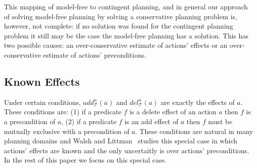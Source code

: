 \documentclass[letterpaper]{article}
\begin{document}
This mapping of model-free to contingent planning, and in general our approach of solving model-free planning by solving a conservative planning problem is, however, not complete: if no solution was found for the contingent planning problem it still may be the case the model-free planning has a solution. This has two possible causes: an over-conservative estimate of actions' effects or an over-conservative estimate of actions' preconditions. 

\subsection{Known Effects}

 
 Under certain conditions, $add_\mathcal{T}^u(a)$ 
 and $del_\mathcal{T}^u(a)$ are exactly the effects of $a$. These conditions are:
 (1) if a predicate $f$ is a delete effect of an action $a$ then $f$ is a precondition of $a$, 
 (2) if a predicate $f$ is an add effect of $a$ then $f$ must be mutually exclusive with a precondition of $a$. 
 These conditions are natural in many planning domains and Walsh and Littman~ studies this special case in which actions' effects are known and the only uncertaitly is over actions' preconditions. 
 In the rest of this paper we focus on this special case. 
 
\end{document}
